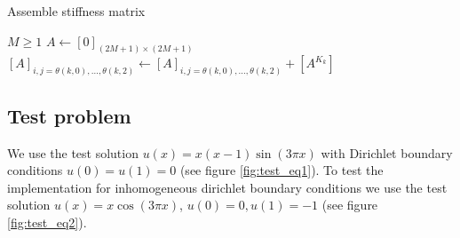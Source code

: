 \begin{algorithm}
\caption{Assemble stiffness matrix}\label{alg:assemble_stiffness_matrix}
\begin{algorithmic}
\Require $M \geq 1$
\State $A \gets [0]_{(2M+1) \times (2M+1)}$
\State $[A]_{i, j=\theta(k, 0), \dots, \theta(k, 2)}
\gets [A]_{i, j=\theta(k, 0), \dots, \theta(k, 2)} + [A^{K_k}]$
\EndFor


\end{algorithmic}
\end{algorithm}

\subsection{Test problem}

We use the test solution \( u(x) = x(x-1)\sin(3\pi x) \)
with Dirichlet boundary conditions \( u(0) = u(1) = 0 \)
(see figure \ref{fig:test_eq1}).
To test the implementation for inhomogeneous dirichlet boundary conditions
we use the test solution \( u(x) = x \cos(3\pi x) \), \( u(0) = 0, u(1) = -1 \)
(see figure \ref{fig:test_eq2}).

